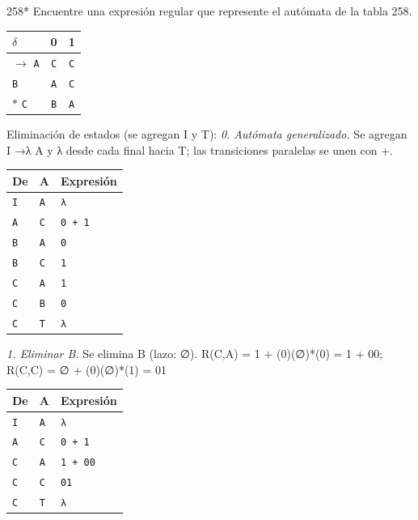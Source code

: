 \documentclass[11pt]{article}
\begin{document}
\begin{ejercicio}{258}{*}
Encuentre una expresión regular que represente el autómata de la tabla 258.
\end{ejercicio}
\proc \begin{center}\small\begin{tabular}{lcc}\toprule
$\delta$ & 0 & 1 \\\midrule
$\to$ \texttt{A} & \texttt{C} & \texttt{C} \\
 \texttt{B} & \texttt{A} & \texttt{C} \\
$*$ \texttt{C} & \texttt{B} & \texttt{A} \\
\bottomrule\end{tabular}\end{center}
Eliminación de estados (se agregan I y T):
\textit{0. Autómata generalizado.} Se agregan I →λ A y λ desde cada final hacia T; las transiciones paralelas se unen con +.
\begin{center}\footnotesize\begin{tabular}{lll}\toprule
De & A & Expresión \\\midrule
\texttt{I} & \texttt{A} & \texttt{λ} \\
\texttt{A} & \texttt{C} & \texttt{0 + 1} \\
\texttt{B} & \texttt{A} & \texttt{0} \\
\texttt{B} & \texttt{C} & \texttt{1} \\
\texttt{C} & \texttt{A} & \texttt{1} \\
\texttt{C} & \texttt{B} & \texttt{0} \\
\texttt{C} & \texttt{T} & \texttt{λ} \\
\bottomrule\end{tabular}\end{center}
\textit{1. Eliminar B.} Se elimina B (lazo: ∅). R(C,A) = 1 + (0)(∅)*(0) = 1 + 00; R(C,C) = ∅ + (0)(∅)*(1) = 01
\begin{center}\footnotesize\begin{tabular}{lll}\toprule
De & A & Expresión \\\midrule
\texttt{I} & \texttt{A} & \texttt{λ} \\
\texttt{A} & \texttt{C} & \texttt{0 + 1} \\
\texttt{C} & \texttt{A} & \texttt{1 + 00} \\
\texttt{C} & \texttt{C} & \texttt{01} \\
\texttt{C} & \texttt{T} & \texttt{λ} \\
\bottomrule\end{tabular}\end{center}
\end{document}
